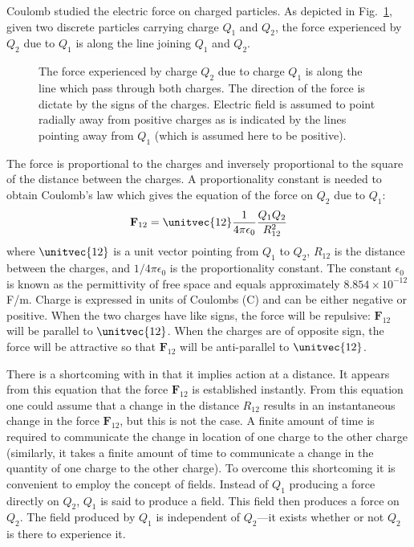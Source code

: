 Coulomb studied the electric force on charged particles.  As depicted
in Fig.\ \ref{fig:coulomb}, given two
discrete particles carrying charge $Q_1$ and $Q_2$, the force
experienced by $Q_2$ due to $Q_1$ is along the line joining $Q_1$ and
$Q_2$.
\begin{figure}
  \begin{center}
  \end{center}
  \caption{The force experienced by charge $Q_2$ due to charge $Q_1$ is
  along the line which pass through both charges.  The direction of
  the force is dictate by the signs of the charges.  Electric field is
  assumed to point radially away from positive charges as is indicated
  by the lines pointing away from $Q_1$ (which is assumed here to
  be positive).}
  \label{fig:coulomb}
\end{figure}
The force is proportional to the charges and inversely proportional to
the square of the distance between the charges.  A proportionality
constant is needed to obtain Coulomb's law which gives the equation of
the force on $Q_2$ due to $Q_1$:
\begin{equation}
  \mathbf{F}_{12} = \unitvec{12}
                    \frac{1}{4\pi\epsilon_0}
                    \frac{Q_1 Q_2}{R_{12}^2}
  \label{eq:coulomb}
\end{equation}
where $\unitvec{12}$ is a unit vector pointing from $Q_1$ to $Q_2$,
$R_{12}$ is the distance between the charges, and $1/4\pi\epsilon_0$
is the proportionality constant.  The constant $\epsilon_0$ is known
as the permittivity of free space and equals approximately
$8.854\times 10^{-12}$ F/m.  Charge is expressed in units of Coulombs
(C) and can be either negative or positive.  When the two charges have
like signs, the force will be repulsive: $\mathbf{F}_{12}$ will
be parallel to $\unitvec{12}$.  When the charges are of opposite sign,
the force will be attractive so that $\mathbf{F}_{12}$ will be
anti-parallel to $\unitvec{12}$.

There is a shortcoming with  in that it implies
action at a distance.  It appears from this equation that the force
$\mathbf{F}_{12}$ is established instantly.  From this equation one
could assume that a change in the distance $R_{12}$ results in an
instantaneous change in the force $\mathbf{F}_{12}$, but this is not
the case.  A finite amount of time is required to communicate the
change in location of one charge to the other charge (similarly, it
takes a finite amount of time to communicate a change in the quantity
of one charge to the other charge).  To overcome this shortcoming it
is convenient to employ the concept of fields.  Instead of $Q_1$
producing a force directly on $Q_2$, $Q_1$ is said to produce a field.
This field then produces a force on $Q_2$.  The field produced by
$Q_1$ is independent of $Q_2$---it exists whether or not $Q_2$ is
there to experience it.

